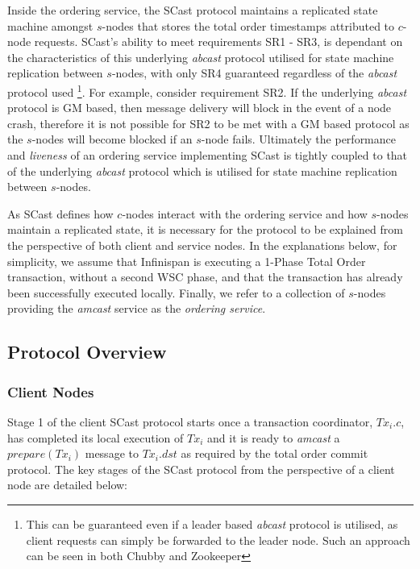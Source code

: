 Inside the ordering service, the \textsf{SCast} protocol maintains a replicated state machine amongst $s$-nodes that stores the total order timestamps attributed to $c$-node requests.  \textsf{SCast}'s ability to meet requirements SR1 - SR3, is dependant on the characteristics of this underlying \emph{abcast} protocol utilised  for state machine replication between $s$-nodes, with only SR4 guaranteed regardless of the \emph{abcast} protocol used \footnote{This can be guaranteed even if a leader based \emph{abcast} protocol is utilised, as client requests can simply be forwarded to the leader node.  Such an approach can be seen in both Chubby and Zookeeper}.  For example, consider requirement SR2.  If the underlying \emph{abcast} protocol is GM based, then message delivery will block in the event of a node crash, therefore it is not possible for SR2 to be met with a GM based protocol as the $s$-nodes will become blocked if an $s$-node fails.  Ultimately the performance and \emph{liveness} of an ordering service implementing \textsf{SCast} is tightly coupled to that of the underlying \emph{abcast} protocol which is utilised for state machine replication between $s$-nodes.  

As \textsf{SCast} defines how $c$-nodes interact with the ordering service and how $s$-nodes maintain a replicated state, it is necessary for the protocol to be explained from the perspective of both client and service nodes.  In the explanations below, for simplicity, we assume that Infinispan is executing a 1-Phase Total Order transaction, without a second WSC phase, and that the transaction has already been successfully executed locally.  Finally, we refer to a collection of $s$-nodes providing the \emph{amcast} service as the \emph{ordering service}.  
    
    \subsection{Protocol Overview} \label{sec:scast_overview}
        \subsubsection*{Client Nodes}
    Stage 1 of the client \textsf{SCast} protocol starts once a transaction coordinator, $Tx_i.c$, has completed its local execution of $Tx_i$ and it is ready to \emph{amcast} a $prepare(Tx_i)$ message to $Tx_i.dst$ as required by the total order commit protocol.  The key stages of the \textsf{SCast} protocol from the perspective of a client node are detailed below:
    
